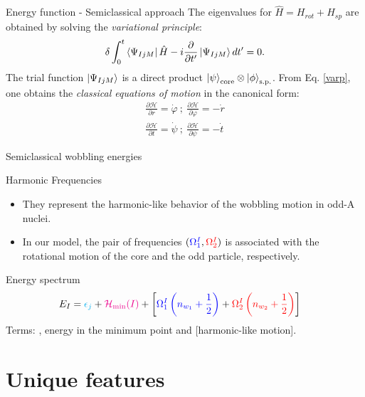 \documentclass{beamer}
\begin{document}
\begin{frame}{Energy function - Semiclassical approach}
      The eigenvalues for $\hat{H}=H_{rot}+H_{sp}$ are obtained by solving the \emph{variational principle}:
  \begin{align}
    \delta \int_0^t\bra{\Psi_{IjM}}\hat{H}-i\frac{\partial}{\partial t'}\ket{\Psi_{IjM}}dt'=0. \label{varp}
  \end{align}
  The trial function $\ket{\Psi_{IjM}}$ is a direct product $\ket{\psi}_\text{core}\otimes\ket{\phi}_\text{s.p.}$.
    From Eq. \ref{varp}, one obtains the \emph{classical equations of motion} in the canonical form:
  \begin{align}
    \frac{\partial \mathcal{H}}{\partial r}=\dot{\varphi}\ ;\ \frac{\partial\mathcal{H}}{\partial\varphi}=-\dot{r}\\
    \frac{\partial \mathcal{H}}{\partial t}=\dot{\psi}\ ;\ \frac{\partial\mathcal{H}}{\partial \psi}=-\dot{t}
  \end{align}
\end{frame}

\begin{frame}{Semiclassical wobbling energies}
\begin{block}{Harmonic Frequencies}
\begin{itemize}
    \item They represent the harmonic-like behavior of the wobbling motion in odd-A nuclei.
  \item In our model, the pair of frequencies $({\color{blue}\Omega_1^I},{\color{red}\Omega_{2}^I})$ is associated with the rotational motion of the {\color{blue}core} and the {\color{red}odd particle}, respectively.
\end{itemize}
\end{block}
\begin{alertblock}{Energy spectrum}
\begin{align}
    E_I&={\color{cyan}\epsilon_{j}}+{\color{magenta}\mathcal{H}_\text{min}(I)}+\left[{\color{blue}\Omega_1^I\left(n_{w_1}+\frac{1}{2}\right)}+{\color{red}\Omega_2^I\left(n_{w_2}+\frac{1}{2}\right)}\right] \label{wobbling_formula}
  \end{align} 
  Terms: {\color{cyan}{single particle energy}}, {\color{magenta}energy in the minimum point} and [harmonic-like motion].
\end{alertblock}
\end{frame}

\section{Unique features}
\end{document}

